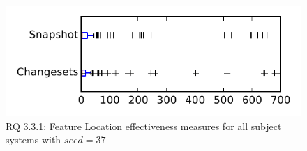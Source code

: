 
\begin{figure}
\centering
\includegraphics[height=0.4\textheight]{figures/flt_seed/rq1_tiny_37}
\caption{RQ 3.3.1: Feature Location effectiveness measures for all subject systems with $seed=37$}
\label{fig:flt_seed:rq1:tiny}
\end{figure}
